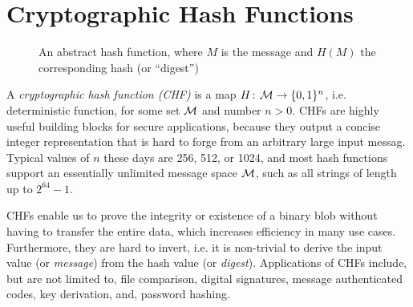 \section{Cryptographic Hash Functions}
\label{sec:hashfunctions}

\begin{figure}
  \centering
    \caption{An abstract hash function, where $M$ is the message and $H(M)$ the corresponding hash (or ``digest'')}
\label{fig:hash-function}
\end{figure}

A \emph{cryptographic hash function (CHF)} is a map $H{{\kern .05em}\colon{\kern .05em}}{\cal M}\rightarrow\{0,1\}^n$, i.e. deterministic function, for
some set ${\cal M}$ and number $n > 0$. 
CHFs are highly useful building blocks for secure applications, because they output a concise integer representation that is hard to forge from an arbitrary large input messag.
Typical values of $n$ these days are 256, 512, or 1024, and most hash functions support an essentially unlimited message space ${\cal M}$, such as all strings of length up to $2^{64}-1$.

CHFs enable us to prove the integrity or existence of a binary blob without having to transfer the entire data, which increases efficiency in many use cases. Furthermore, they are hard to invert, i.e. it is non-trivial to derive the input value (or \emph{message}) from the hash value (or \emph{digest}).
Applications of CHFs include, but are not limited to, file comparison, digital signatures, message authenticated codes, key derivation, and, password hashing.

